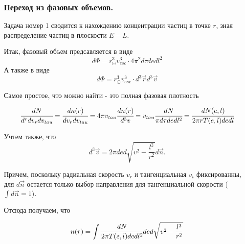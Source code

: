 	
	\subsubsection{Переход из фазовых объемов.}
	Задача номер 1 сводится к нахождению концентрации частиц в точке $r$, зная распределение частиц в плоскости $E-L$.
	
	Итак, фазовый объем предсавляется в виде
	\begin{equation}
		\label{eq:phase_volume_nd}
		d\Phi = r_{\odot}^3v_{esc}^3 \cdot 4\pi^{2} d\tau de dl^2
	\end{equation}
	А также в виде
	\begin{equation}
		d\Phi = r_{\odot}^3v_{esc}^3 \cdot d^3\vec{r}d^3\vec{v}
	\end{equation}
	
	Самое простое, что можно найти - это полная фазовая плотность
	
	\begin{equation*}
		\cfrac{dN}{d^r dv_r dv_{tau}} = 
		\cfrac{dn(r)}{dv_r dv_{tau}} = 
		4\pi v_{tau}\cfrac{dn(r)}{d^3v} = 
		v_{tau}\cfrac{dN}{\pi d\tau de dl^2} = 
		\cfrac{dN(e,l)}{2\pi r T(e,l) de dl}
	\end{equation*}
	
	Учтем также, что
	\begin{equation}
		\label{eq:velocity_dens}
		d^{3}\vec{v}  = 2\pi ded\sqrt{v^2-\frac{l^2}{r^2}} d\vec{n}.
	\end{equation}
	 
	 Причем, поскольку радиальная скорость $v_r$ и тангенциальная $v_{t}$ фиксированны, для $d\vec{n}$ остается только выбор направления для тангенциальной скорости ($\int{d\vec{n}} = 1$).
	 
	 Отсюда получаем, что
	 
	 \begin{equation}
	 	n(r) = \int{ \cfrac{dN}{2\pi T(e,l) de dl^2} de d\sqrt{v^2-\frac{l^2}{r^2}}}
	 \end{equation}
	 
